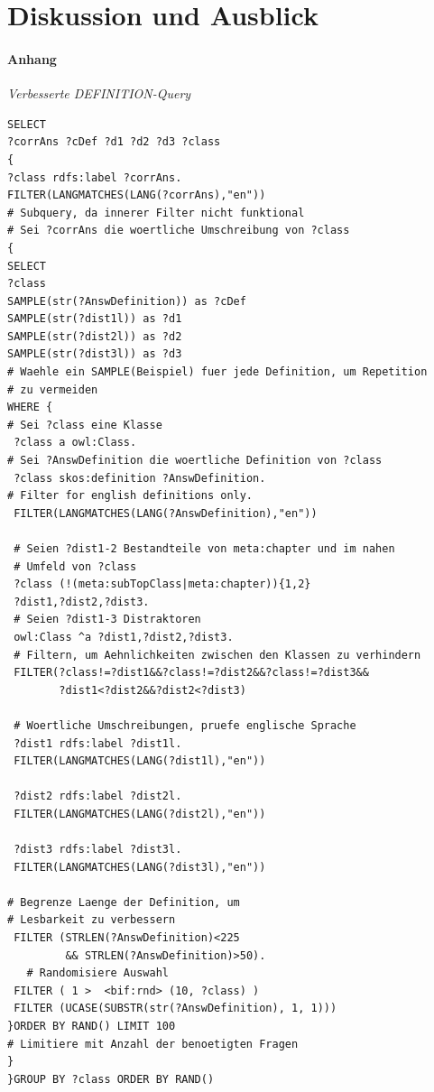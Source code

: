 \documentclass[headsepline,titlepage,ngerman,twoside,12pt]{report}
\newcommand\todo[1]{}%
\begin{document}
\chapter{Diskussion und Ausblick \todo{1--2 Seiten}}
\todo{
In der Diskussion wird das Ergebnis der Arbeit noch einmal kritisch bewertet.
Dies umfasst auch neue Probleme, die erst während der Bearbeitung erkannt wurden.
Die Eignung für ein konkretes Forschungsprojekt sollte hier diskutiert werden.
In der Diskussion kann auch die Kritik des Autors an dem stehen, was er in der Literatur zu dem zu bearbeitenden Thema hier und da gelesen hat.
Außerdem soll ein Ausblick gegeben werden, welche weiteren Fragestellungen noch bearbeitet werden sollten.
}
\newpage
\subsubsection{Anhang}

\textit{Verbesserte DEFINITION-Query}
\begin{lstlisting}[basicstyle=\tiny]
SELECT
?corrAns ?cDef ?d1 ?d2 ?d3 ?class
{
?class rdfs:label ?corrAns.
FILTER(LANGMATCHES(LANG(?corrAns),"en"))
# Subquery, da innerer Filter nicht funktional
# Sei ?corrAns die woertliche Umschreibung von ?class
{
SELECT
?class
SAMPLE(str(?AnswDefinition)) as ?cDef
SAMPLE(str(?dist1l)) as ?d1
SAMPLE(str(?dist2l)) as ?d2
SAMPLE(str(?dist3l)) as ?d3
# Waehle ein SAMPLE(Beispiel) fuer jede Definition, um Repetition
# zu vermeiden
WHERE {
# Sei ?class eine Klasse
 ?class a owl:Class.
# Sei ?AnswDefinition die woertliche Definition von ?class
 ?class skos:definition ?AnswDefinition.
# Filter for english definitions only.
 FILTER(LANGMATCHES(LANG(?AnswDefinition),"en"))

 # Seien ?dist1-2 Bestandteile von meta:chapter und im nahen
 # Umfeld von ?class
 ?class (!(meta:subTopClass|meta:chapter)){1,2} 
 ?dist1,?dist2,?dist3.
 # Seien ?dist1-3 Distraktoren
 owl:Class ^a ?dist1,?dist2,?dist3.
 # Filtern, um Aehnlichkeiten zwischen den Klassen zu verhindern
 FILTER(?class!=?dist1&&?class!=?dist2&&?class!=?dist3&&
        ?dist1<?dist2&&?dist2<?dist3)

 # Woertliche Umschreibungen, pruefe englische Sprache
 ?dist1 rdfs:label ?dist1l.
 FILTER(LANGMATCHES(LANG(?dist1l),"en"))

 ?dist2 rdfs:label ?dist2l.
 FILTER(LANGMATCHES(LANG(?dist2l),"en"))

 ?dist3 rdfs:label ?dist3l.
 FILTER(LANGMATCHES(LANG(?dist3l),"en"))

# Begrenze Laenge der Definition, um
# Lesbarkeit zu verbessern
 FILTER (STRLEN(?AnswDefinition)<225 
         && STRLEN(?AnswDefinition)>50).
   # Randomisiere Auswahl
 FILTER ( 1 >  <bif:rnd> (10, ?class) )
 FILTER (UCASE(SUBSTR(str(?AnswDefinition), 1, 1)))
}ORDER BY RAND() LIMIT 100
# Limitiere mit Anzahl der benoetigten Fragen
}
}GROUP BY ?class ORDER BY RAND()

\end{lstlisting}
\end{document}
